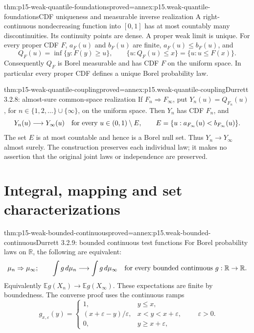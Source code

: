 \begin{hblemma}{thm:p15-weak-quantile-foundations}{proved=annex:p15.weak-quantile-foundations}{CDF uniqueness and measurable inverse realization}
A right-continuous nondecreasing function into \([0,1]\) has at
most countably many discontinuities. Its continuity points are
dense. A proper weak limit is unique.
For every proper CDF \(F\), \(a_F(u)\) and \(b_F(u)\) are finite,
\(a_F(u)\leq b_F(u)\), and
\[
 Q_F(u)=\inf\{y:F(y)\geq u\},\qquad
 \{u:Q_F(u)\leq x\}=\{u:u\leq F(x)\}.
\]
Consequently \(Q_F\) is Borel measurable and has CDF \(F\) on
the uniform space. In particular every proper CDF defines a
unique Borel probability law.
\end{hblemma}

\begin{hbtheorem}{thm:p15-weak-quantile-coupling}{proved=annex:p15.weak-quantile-coupling}{Durrett 3.2.8: almost-sure common-space realization}
If \(F_n\Rightarrow F_\infty\), put
\(Y_n(u)=Q_{F_n}(u)\), for \(n\in\{1,2,\ldots\}\cup\{\infty\}\),
on the uniform space. Then \(Y_n\) has CDF \(F_n\), and
\[
 Y_n(u)\longrightarrow Y_\infty(u)
       \quad\hbox{for every }u\in(0,1)\setminus E,
 \qquad
 E=\{u:a_{F_\infty}(u)<b_{F_\infty}(u)\}.
\]
The set \(E\) is at most countable and hence is a Borel null set.
Thus \(Y_n\to Y_\infty\) almost surely.
The construction preserves each individual law; it makes no
assertion that the original joint laws or independence are preserved.
\end{hbtheorem}

\section{Integral, mapping and set characterizations}
\label{sec:p15-weak-characterizations}

\begin{hbtheorem}{thm:p15-weak-bounded-continuous}{proved=annex:p15.weak-bounded-continuous}{Durrett 3.2.9: bounded continuous test functions}
For Borel probability laws on \(\mathbb R\), the following are
equivalent:
\[
 \mu_n\Rightarrow\mu_\infty;\qquad
 \int g\,d\mu_n\longrightarrow\int g\,d\mu_\infty
   \quad\hbox{for every bounded continuous }g:\mathbb R\to\mathbb R.
\]
Equivalently \(\mathbb E g(X_n)\to\mathbb E g(X_\infty)\).
These expectations are finite by boundedness.
The converse proof uses the continuous ramps
\[
 g_{x,\varepsilon}(y)=
 \begin{cases}
 1,&y\leq x,\\
 (x+\varepsilon-y)/\varepsilon,&x<y<x+\varepsilon,\\
 0,&y\geq x+\varepsilon,
 \end{cases}
 \qquad \varepsilon>0.
\]
\end{hbtheorem}


